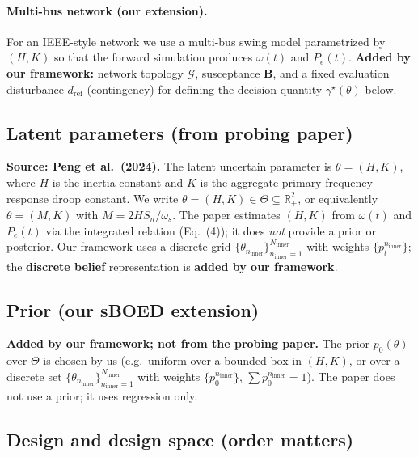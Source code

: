 \documentclass[10pt]{article}
\newcommand{\Ninner}{N_{\mathrm{inner}}}
\newcommand{\ninner}{n_{\mathrm{inner}}}
\begin{document}
\paragraph{Multi-bus network (our extension).}
For an IEEE-style network we use a multi-bus swing model parametrized by $(H,K)$ so that the forward simulation produces $\omega(t)$ and $P_e(t)$. \textbf{Added by our framework:} network topology $\mathcal{G}$, susceptance $\bm{B}$, and a fixed evaluation disturbance $d_{\mathrm{ref}}$ (contingency) for defining the decision quantity $\gamma^\star(\theta)$ below.

\subsection{Latent parameters (from probing paper)}
\label{sec:latent}

\textbf{Source: Peng et al.\ (2024).} The latent uncertain parameter is $\theta=(H,K)$, where $H$ is the inertia constant and $K$ is the aggregate primary-frequency-response droop constant. We write $\theta=(H,K)\in\Theta\subseteq\mathbb{R}_+^2$, or equivalently $\theta=(M,K)$ with $M=2HS_n/\omega_s$. The paper estimates $(H,K)$ from $\omega(t)$ and $P_e(t)$ via the integrated relation (Eq.\ (4)); it does \emph{not} provide a prior or posterior. Our framework uses a discrete grid $\{\theta_{\ninner}\}_{\ninner=1}^{\Ninner}$ with weights $\{p_t^{\ninner}\}$; the \textbf{discrete belief} representation is \textbf{added by our framework}.

\subsection{Prior (our sBOED extension)}
\label{sec:prior}

\textbf{Added by our framework; not from the probing paper.} The prior $p_0(\theta)$ over $\Theta$ is chosen by us (e.g.\ uniform over a bounded box in $(H,K)$, or over a discrete set $\{\theta_{\ninner}\}_{\ninner=1}^{\Ninner}$ with weights $\{p_0^{\ninner}\}$, $\sum p_0^{\ninner}=1$). The paper does not use a prior; it uses regression only.

\subsection{Design and design space (order matters)}
\label{sec:design}
\end{document}
